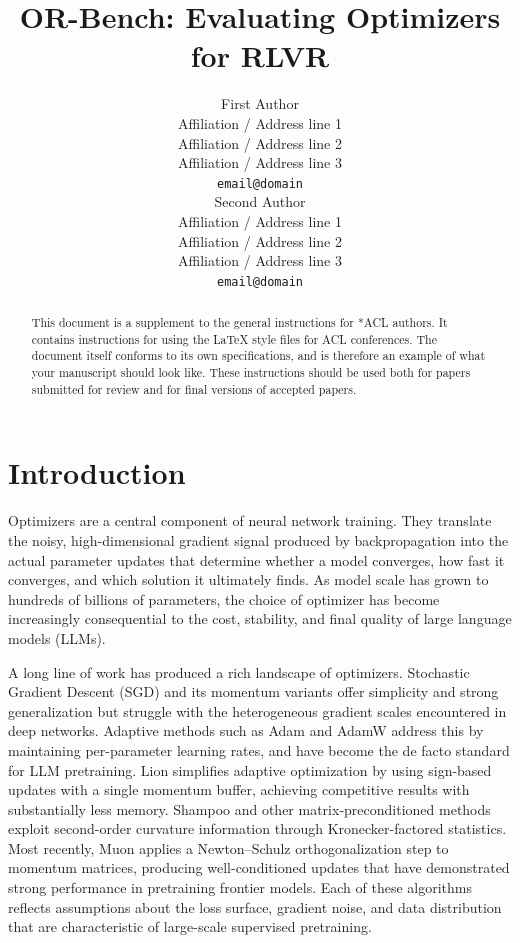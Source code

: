 \documentclass[11pt]{article}
\title{OR-Bench: Evaluating Optimizers for RLVR}
\author{First Author \\
  Affiliation / Address line 1 \\
  Affiliation / Address line 2 \\
  Affiliation / Address line 3 \\
  \texttt{email@domain} \\\And
  Second Author \\
  Affiliation / Address line 1 \\
  Affiliation / Address line 2 \\
  Affiliation / Address line 3 \\
  \texttt{email@domain} \\}
\begin{document}
\maketitle
\begin{abstract}
This document is a supplement to the general instructions for *ACL authors. It contains instructions for using the \LaTeX{} style files for ACL conferences.
The document itself conforms to its own specifications, and is therefore an example of what your manuscript should look like.
These instructions should be used both for papers submitted for review and for final versions of accepted papers.
\end{abstract}

\section{Introduction}

Optimizers are a central component of neural network training. They translate the noisy, high-dimensional gradient signal produced by backpropagation into the actual parameter updates that determine whether a model converges, how fast it converges, and which solution it ultimately finds. As model scale has grown to hundreds of billions of parameters, the choice of optimizer has become increasingly consequential to the cost, stability, and final quality of large language models (LLMs).

A long line of work has produced a rich landscape of optimizers. Stochastic Gradient Descent (SGD) and its momentum variants \citep{robbins1951sgd, polyak1964momentum} offer simplicity and strong generalization but struggle with the heterogeneous gradient scales encountered in deep networks. Adaptive methods such as Adam and AdamW \citep{kingma2015adam, loshchilov2019adamw} address this by maintaining per-parameter learning rates, and have become the de facto standard for LLM pretraining. Lion \citep{chen2023lion} simplifies adaptive optimization by using sign-based updates with a single momentum buffer, achieving competitive results with substantially less memory. Shampoo \citep{gupta2018shampoo} and other matrix-preconditioned methods exploit second-order curvature information through Kronecker-factored statistics. Most recently, Muon \citep{jordan2024muon} applies a Newton--Schulz orthogonalization step to momentum matrices, producing well-conditioned updates that have demonstrated strong performance in pretraining frontier models. Each of these algorithms reflects assumptions about the loss surface, gradient noise, and data distribution that are characteristic of large-scale supervised pretraining.
\end{document}
